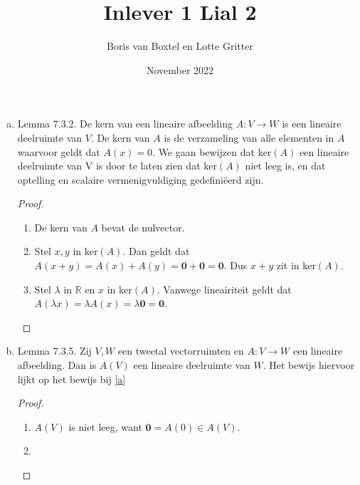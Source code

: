 \documentclass[12pt, a4paper]{article}
\title{Inlever 1 Lial 2}
\author{Boris van Boxtel en Lotte Gritter}
\date{November 2022}
\begin{document}
\maketitle 

\begin{enumerate}[(a).]
    \item \label{a}
    Lemma 7.3.2. De kern van een lineaire afbeelding $A: V \rightarrow W$ is een lineaire deelruimte van $V$. \newline 
    De kern van $A$ is de verzameling van alle elementen in $A$ waarvoor geldt dat $A(x)=0$. We gaan bewijzen dat ker$(A)$ een lineaire deelruimte van V is door te laten zien dat ker$(A)$ niet leeg is, en dat optelling en scalaire vermenigvuldiging gedefiniëerd zijn.

        \begin{proof}\leavevmode
            \begin{enumerate}[1.]
                \item De kern van $A$ bevat de nulvector. 
                
                \item Stel $x,y$ in ker$(A)$. Dan geldt dat $A(x+y)=A(x)+A(y)= \mathbf{0} + \mathbf{0}=\mathbf{0}$. Dus $x+y$ zit in ker$(A)$. 
                
                \item Stel $\lambda$ in $\mathbb{R}$ en $x$ in ker$(A)$. Vanwege lineairiteit geldt dat $A(\lambda x)=\lambda A(x) = \lambda \mathbf{0} = \mathbf{0}$.
            \end{enumerate}
        \end{proof}

    \item \label{b}
    Lemma 7.3.5. Zij $V, W$ een tweetal vectorruimten en $A: V \rightarrow W$ een lineaire afbeelding. Dan is $A(V)$ een lineaire deelruimte van $W$.
    \newline Het bewijs hiervoor lijkt op het bewijs bij \ref{a}

        \begin{proof}\leavevmode
          \begin{enumerate}[1.]
            \item $A(V)$ is niet leeg, want $\mathbf{0}=A(0) \in A(V)$.
            
            \item
          \end{enumerate} 
        \end{proof}


\end{enumerate}
\end{document}
